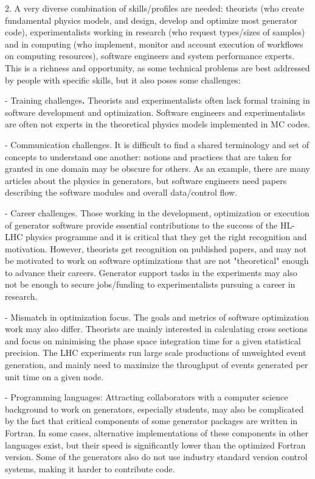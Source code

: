 \documentclass[11pt,a4paper]{article}
\begin{document}
2. {A very diverse combination of skills/profiles are needed}: theorists
(who create fundamental physics models, and design, develop and optimize
most generator code), experimentalists working in research (who request
types/sizes of samples) and in computing (who implement, monitor and
account execution of workflows on computing resources), software
engineers and system performance experts. This is a richness and
opportunity, as some technical problems are best addressed by people
with specific skills, but it also poses some challenges:

- {Training challenges}\textbf{.} Theorists and experimentalists often
lack formal training in software development and optimization. Software
engineers and experimentalists are often not experts in the theoretical
physics models implemented in MC codes.

- {Communication challenges}. It is difficult to find a shared
terminology and set of concepts to understand one another: notions and
practices that are taken for granted in one domain may be obscure for
others. As an example, there are many articles about the physics in
generators, but software engineers need papers describing the software
modules and overall data/control flow.

- {Career challenges}. Those working in the development, optimization or
execution of generator software provide essential contributions to the
success of the HL-LHC physics programme and it is critical that they get
the right recognition and motivation. However, theorists get recognition
on published papers, and may not be motivated to work on software
optimizations that are not "theoretical" enough to advance their
careers. Generator support tasks in the experiments may also not be
enough to secure jobs/funding to experimentalists pursuing a career in
research.

- {Mismatch in optimization focus}. The goals and metrics of software
optimization work may also differ. Theorists are mainly interested in
calculating cross sections and focus on minimising the phase space
integration time for a given statistical precision. The LHC experiments
run large scale productions of unweighted event generation, and mainly
need to maximize the throughput of events generated per unit time on a
given node.

- {Programming languages}: Attracting collaborators with a computer
science background to work on generators, especially students, may also
be complicated by the fact that critical components of some generator
packages are written in Fortran. In some cases, alternative
implementations of these components in other languages exist, but their
speed is significantly lower than the optimized Fortran version. Some of
the generators also do not use industry standard version control
systems, making it harder to contribute code.
\end{document}
